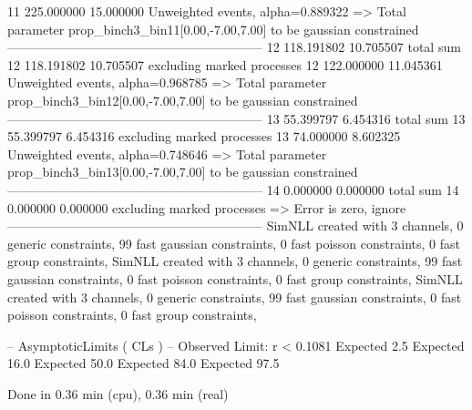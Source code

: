 11         225.000000      15.000000       Unweighted events, alpha=0.889322
  => Total parameter prop_binch3_bin11[0.00,-7.00,7.00] to be gaussian constrained
------------------------------------------------------------
12         118.191802      10.705507       total sum                     
12         118.191802      10.705507       excluding marked processes    
12         122.000000      11.045361       Unweighted events, alpha=0.968785
  => Total parameter prop_binch3_bin12[0.00,-7.00,7.00] to be gaussian constrained
------------------------------------------------------------
13         55.399797       6.454316        total sum                     
13         55.399797       6.454316        excluding marked processes    
13         74.000000       8.602325        Unweighted events, alpha=0.748646
  => Total parameter prop_binch3_bin13[0.00,-7.00,7.00] to be gaussian constrained
------------------------------------------------------------
14         0.000000        0.000000        total sum                     
14         0.000000        0.000000        excluding marked processes    
  => Error is zero, ignore      
------------------------------------------------------------
SimNLL created with 3 channels, 0 generic constraints, 99 fast gaussian constraints, 0 fast poisson constraints, 0 fast group constraints, 
SimNLL created with 3 channels, 0 generic constraints, 99 fast gaussian constraints, 0 fast poisson constraints, 0 fast group constraints, 
SimNLL created with 3 channels, 0 generic constraints, 99 fast gaussian constraints, 0 fast poisson constraints, 0 fast group constraints, 

 -- AsymptoticLimits ( CLs ) --
Observed Limit: r < 0.1081
Expected  2.5%
Expected 16.0%
Expected 50.0%
Expected 84.0%
Expected 97.5%

Done in 0.36 min (cpu), 0.36 min (real)
